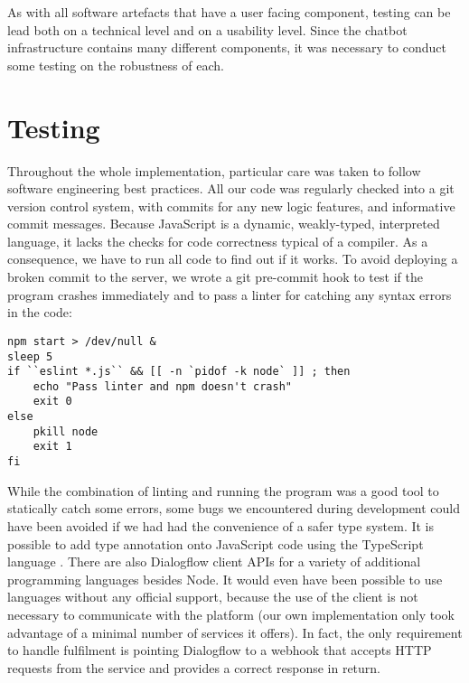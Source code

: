 As with all software artefacts that have a user facing component, testing can be lead both on a technical level and on a usability level. Since the chatbot infrastructure contains many different components, it was necessary to conduct some testing on the robustness of each.
\section{Testing}
Throughout the whole implementation, particular care was taken to follow software engineering best practices. All our code was regularly checked into a git version control system, with commits for any new logic features, and informative commit messages. Because JavaScript is a dynamic, weakly-typed, interpreted language, it lacks the checks for code correctness typical of a compiler. As a consequence, we have to run all code to find out if it works. To avoid deploying a broken commit to the server, we wrote a git pre-commit hook to test if the program crashes immediately and to pass a linter for catching any syntax errors in the code:
\begin{lstlisting}
npm start > /dev/null &
sleep 5
if ``eslint *.js`` && [[ -n `pidof -k node` ]] ; then
    echo "Pass linter and npm doesn't crash"
    exit 0
else
    pkill node
    exit 1
fi
\end{lstlisting}
While the combination of linting and running the program was a good tool to statically catch some errors, some bugs we encountered during development could have been avoided if we had had the convenience of a safer type system. It is possible to add type annotation onto JavaScript code using the TypeScript language \cite{typescript}. There are also Dialogflow client APIs for a variety of additional programming languages besides Node. It would even have been possible to use languages without any official support, because the use of the client is not necessary to communicate with the platform (our own implementation only took advantage of a minimal number of services it offers). In fact, the only requirement to handle fulfilment is pointing Dialogflow to a webhook that accepts HTTP requests from the service and provides a correct response in return. 

